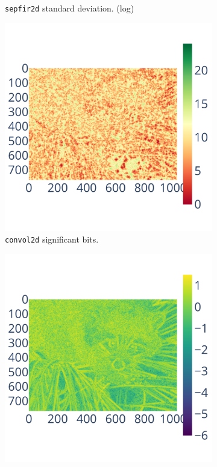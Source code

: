 \documentclass[11pt]{article}
\begin{document}
\begin{figure}
\begin{subfigure}{0.3\linewidth}
    \caption{\centering\texttt{sepfir2d} standard deviation. (log)}
    \label{fig:bspline_bisplev_std}
\end{subfigure}
\begin{subfigure}{0.3\linewidth}
    \includegraphics[width=\linewidth]{figure/bspline/convol2d_sig.pdf}
    \caption{\centering\texttt{convol2d} significant bits. \newline \textcolor{white}{.}}
    \label{fig:bspline_convol2d_sig}
\end{subfigure}
\begin{subfigure}{0.3\linewidth}
    \includegraphics[width=\linewidth]{figure/bspline/convol2d_mean_log.pdf}

\end{subfigure}
\end{figure}
\end{document}
